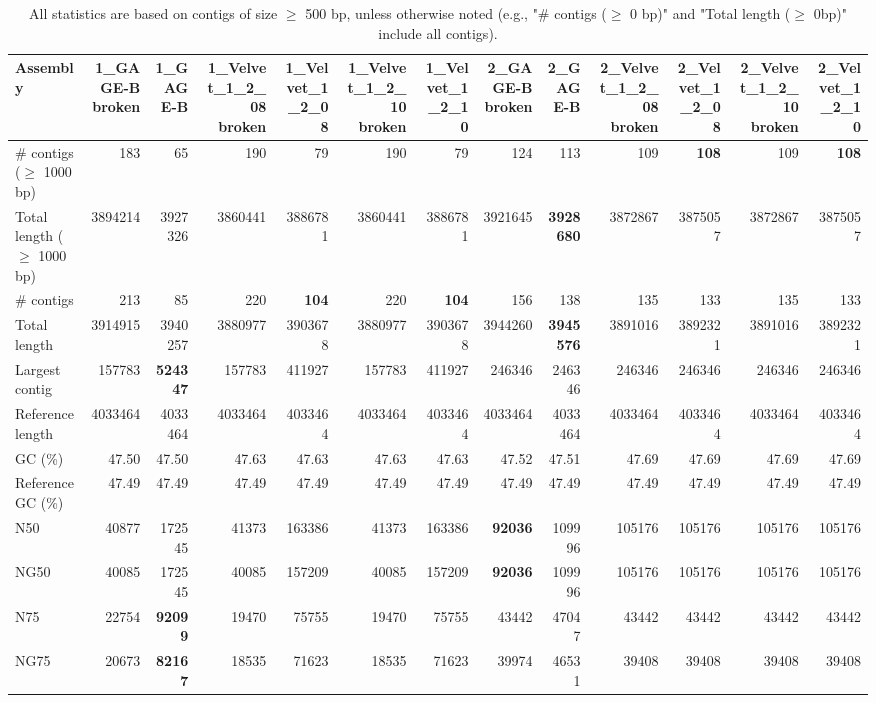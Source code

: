 \documentclass[12pt,a4paper]{article}
\begin{document}
\begin{table}[ht]
\begin{center}
\caption{All statistics are based on contigs of size $\geq$ 500 bp, unless otherwise noted (e.g., "\# contigs ($\geq$ 0 bp)" and "Total length ($\geq$ 0bp)" include all contigs).}
\begin{tabular}{|l*{12}{|r}|}
\hline
Assembly & 1\_GAGE-B broken & 1\_GAGE-B & 1\_Velvet\_1\_2\_08 broken & 1\_Velvet\_1\_2\_08 & 1\_Velvet\_1\_2\_10 broken & 1\_Velvet\_1\_2\_10 & 2\_GAGE-B broken & 2\_GAGE-B & 2\_Velvet\_1\_2\_08 broken & 2\_Velvet\_1\_2\_08 & 2\_Velvet\_1\_2\_10 broken & 2\_Velvet\_1\_2\_10 \\ \hline
\# contigs ($\geq$ 1000 bp) & 183 & 65 & 190 & 79 & 190 & 79 & 124 & 113 & 109 & {\bf 108} & 109 & {\bf 108} \\ \hline
Total length ($\geq$ 1000 bp) & 3894214 & 3927326 & 3860441 & 3886781 & 3860441 & 3886781 & 3921645 & {\bf 3928680} & 3872867 & 3875057 & 3872867 & 3875057 \\ \hline
\# contigs & 213 & 85 & 220 & {\bf 104} & 220 & {\bf 104} & 156 & 138 & 135 & 133 & 135 & 133 \\ \hline
Total length & 3914915 & 3940257 & 3880977 & 3903678 & 3880977 & 3903678 & 3944260 & {\bf 3945576} & 3891016 & 3892321 & 3891016 & 3892321 \\ \hline
Largest contig & 157783 & {\bf 524347} & 157783 & 411927 & 157783 & 411927 & 246346 & 246346 & 246346 & 246346 & 246346 & 246346 \\ \hline
Reference length & 4033464 & 4033464 & 4033464 & 4033464 & 4033464 & 4033464 & 4033464 & 4033464 & 4033464 & 4033464 & 4033464 & 4033464 \\ \hline
GC (\%) & 47.50 & 47.50 & 47.63 & 47.63 & 47.63 & 47.63 & 47.52 & 47.51 & 47.69 & 47.69 & 47.69 & 47.69 \\ \hline
Reference GC (\%) & 47.49 & 47.49 & 47.49 & 47.49 & 47.49 & 47.49 & 47.49 & 47.49 & 47.49 & 47.49 & 47.49 & 47.49 \\ \hline
N50 & 40877 & 172545 & 41373 & 163386 & 41373 & 163386 & {\bf 92036} & 109996 & 105176 & 105176 & 105176 & 105176 \\ \hline
NG50 & 40085 & 172545 & 40085 & 157209 & 40085 & 157209 & {\bf 92036} & 109996 & 105176 & 105176 & 105176 & 105176 \\ \hline
N75 & 22754 & {\bf 92099} & 19470 & 75755 & 19470 & 75755 & 43442 & 47047 & 43442 & 43442 & 43442 & 43442 \\ \hline
NG75 & 20673 & {\bf 82167} & 18535 & 71623 & 18535 & 71623 & 39974 & 46531 & 39408 & 39408 & 39408 & 39408 \\ \hline

\end{tabular}
\end{center}
\end{table}
\end{document}
